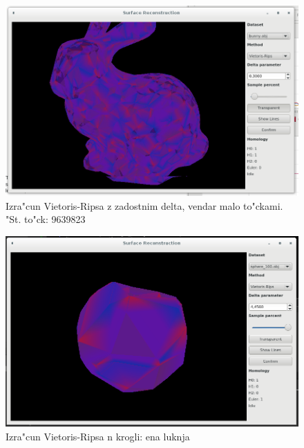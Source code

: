 \documentclass[11pt]{article}
\begin{document}
\begin{figure}[htb]
    \centering
    \includegraphics[width=1\textwidth]{vr_full_9639823.png}
    \caption{Izra"cun Vietoris-Ripsa z zadostnim delta, vendar malo to"ckami. "St. to"ck: 9639823}
    \label{fig:vr2}
\end{figure}

\begin{figure}[htb]
    \centering
    \includegraphics[width=1\textwidth]{vr_1hole.png}
    \caption{Izra"cun Vietoris-Ripsa n krogli: ena luknja}
    \label{fig:vr3}
\end{figure}
\end{document}
